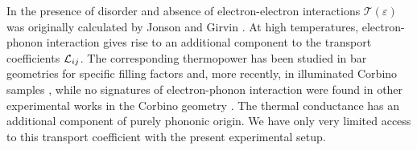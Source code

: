 In the presence of disorder and absence of electron-electron interactions ${\mathcal T}(\varepsilon)$ was originally calculated by Jonson and Girvin \cite{jonson1984thermoelectric}. At high temperatures, electron-phonon interaction gives rise to an additional component to the transport coefficients ${\cal L}_{ij}$. The corresponding thermopower has been studied  in bar geometries for specific filling factors \cite{tieke1996even,zhang2004oscillatory} and, more recently, in illuminated Corbino samples \cite{Zalinge2003}, while no signatures of electron-phonon interaction were found in other experimental works in the Corbino geometry \cite{kobayakawa2013diffusion}.
The thermal conductance has an additional component of purely phononic origin. We have only very limited access to this transport coefficient with the present experimental setup.
